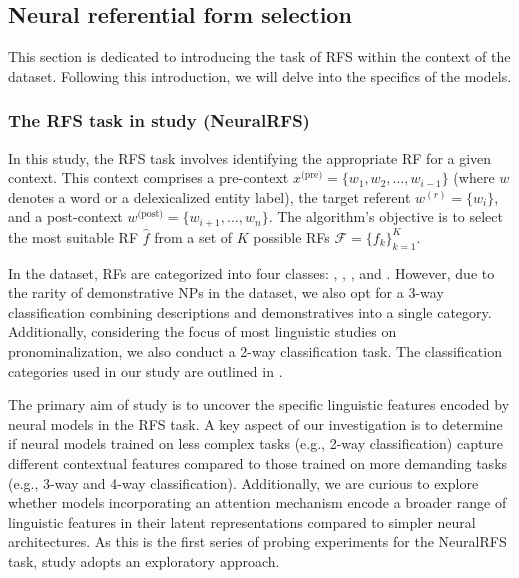 \subsection{Neural referential form selection} \label{sec:modelrfs}
This section is dedicated to introducing the task of RFS within the context of the \webnlg dataset. Following this introduction, we will delve into the specifics of the  models.

\subsubsection{The RFS task in study \studG (NeuralRFS)}

In this study, the RFS task involves identifying the appropriate RF for a given context. This context comprises a pre-context $x^{\text{(pre)}} = \{w_1, w_2, ..., w_{i-1}\}$ (where $w$ denotes a word or a delexicalized entity label), the target referent $w^{(r)} = \{w_i\}$, and a post-context $w^{\text{(post)}} = \{w_{i+1}, ..., w_n\}$. The algorithm's objective is to select the most suitable RF $\hat{f}$ from a set of $K$ possible RFs $\mathcal{F} = \{f_k\}_{k=1}^K$.

In the \webnlg dataset, RFs are categorized into four classes: , , , and . However, due to the rarity of demonstrative NPs in the dataset, we also opt for a 3-way classification combining descriptions and demonstratives into a single category. Additionally, considering the focus of most linguistic studies on pronominalization, we also conduct a 2-way classification task. The classification categories used in our study are outlined in .



The primary aim of study \studG is to uncover the specific linguistic features encoded by neural models in the RFS task. A key aspect of our investigation is to determine if neural models trained on less complex tasks (e.g., 2-way classification) capture different contextual features compared to those trained on more demanding tasks (e.g., 3-way and 4-way classification). Additionally, we are curious to explore whether models incorporating an attention mechanism encode a broader range of linguistic features in their latent representations compared to simpler neural architectures. As this is the first series of probing experiments for the NeuralRFS task, study \studG adopts an exploratory approach.

